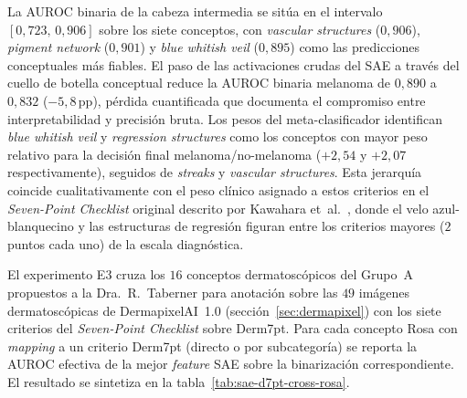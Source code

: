 La AUROC binaria de la cabeza intermedia se sitúa en el intervalo
$[0{,}723,\,0{,}906]$ sobre los siete conceptos, con
\emph{vascular structures} ($0{,}906$), \emph{pigment network}
($0{,}901$) y \emph{blue whitish veil} ($0{,}895$) como las
predicciones conceptuales más fiables. El paso de las activaciones
crudas del SAE a través del cuello de botella conceptual reduce
la AUROC binaria melanoma de $0{,}890$ a $0{,}832$
($-5{,}8$\,pp), pérdida cuantificada que documenta el compromiso
entre interpretabilidad y precisión bruta. Los pesos del
meta-clasificador identifican \emph{blue whitish veil} y
\emph{regression structures} como los conceptos con mayor peso
relativo para la decisión final melanoma/no-melanoma
($+2{,}54$ y $+2{,}07$ respectivamente), seguidos de
\emph{streaks} y \emph{vascular structures}. Esta jerarquía
coincide cualitativamente con el peso clínico asignado a estos
criterios en el \emph{Seven-Point Checklist} original
descrito por Kawahara et~al.~\cite{kawahara2019}, donde el velo
azul-blanquecino y las estructuras de regresión figuran entre los
criterios mayores ($2$ puntos cada uno) de la escala
diagnóstica.

El experimento E3 cruza los $16$ conceptos dermatoscópicos del
Grupo~A propuestos a la Dra.~R.~Taberner para anotación sobre las
$49$ imágenes dermatoscópicas de DermapixelAI~1.0
(secci\'on~\ref{sec:dermapixel}) con los siete criterios del
\emph{Seven-Point Checklist} sobre Derm7pt. Para cada concepto
Rosa con \emph{mapping} a un criterio Derm7pt (directo o por
subcategoría) se reporta la AUROC efectiva de la mejor
\emph{feature} SAE sobre la binarización correspondiente. El
resultado se sintetiza en la tabla~\ref{tab:sae-d7pt-cross-rosa}.

